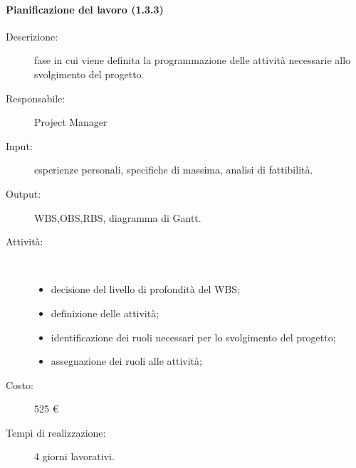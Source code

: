 \paragraph{Pianificazione del lavoro (1.3.3)}
\begin{description}
\item[Descrizione:] fase in cui viene definita la programmazione delle attivit\`{a} necessarie allo svolgimento del progetto.
\item[Responsabile:] Project Manager
\item[Input:] esperienze personali, specifiche di massima, analisi di fattibilit\`{a}.
\item[Output:] WBS,OBS,RBS, diagramma di Gantt.
\item[Attività:]\mbox{}\\[-1.5\baselineskip]
	\begin{itemize}
	\item decisione del livello di profondit\`{a} del WBS;
	\item definizione delle attivit\`{a};
	\item identificazione dei ruoli necessari per lo svolgimento del progetto;
	\item assegnazione dei ruoli alle attivit\`{a};
	\end{itemize}
\item[Costo:] 525 \euro{}
\item[Tempi di realizzazione:] 4 giorni lavorativi.
\end{description}

